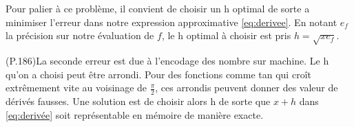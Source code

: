 \documentclass{article}
\begin{document}
Pour palier à ce problème, il convient de choisir un h optimal de sorte a minimiser l'erreur dans notre expression approximative \ref{eq:derivee}. En notant $e_f$ la précision sur notre évaluation de $f$, le h optimal à choisir est pris $h = \sqrt{xe_f}$.
\newline

(P.186)La seconde erreur est due à l'encodage des nombre sur machine. Le h qu'on a choisi peut être arrondi. Pour des fonctions comme tan qui croît extrêmement vite au voisinage de $\frac{\pi}{2}$, ces arrondis peuvent donner des valeur de dérivés fausses. Une solution est de choisir alors h de sorte que $x+h$ dans \ref{eq:derivée} soit représentable en mémoire de manière exacte.
\end{document}
